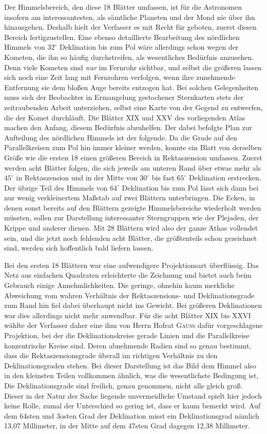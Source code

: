 Der Himmelsbereich, den diese 18 Blätter umfassen, ist für die Astronomen insofern am interessantesten, als sämtliche Planeten und der Mond nie über ihn hinausgehen. Deshalb hielt der Verfasser es mit Recht für geboten, zuerst diesen Bereich fertigzustellen. Eine ebenso detaillierte Bearbeitung des nördlichen Himmels von $32^\circ$ Deklination bis zum Pol wäre allerdings schon wegen der Kometen, die ihn so häufig durchstreifen, als wesentliches Bedürfnis anzusehen. Denn viele Kometen sind \emph{nur} im Fernrohr sichtbar, und selbst die größeren lassen sich noch eine Zeit lang mit Fernrohren verfolgen, wenn ihre zunehmende Entfernung sie dem bloßen Auge bereits entzogen hat. Bei solchen Gelegenheiten muss sich der Beobachter in Ermangelung gestochener Sternkarten stets der zeitraubenden Arbeit unterziehen, selbst eine Karte von der Gegend zu entwerfen, die der Komet durchläuft. Die Blätter XIX und XXV des vorliegenden Atlas machen den Anfang, diesem Bedürfnis abzuhelfen. Der dabei befolgte Plan zur Aufteilung des nördlichen Himmels ist der folgende. Da die Grade auf den Parallelkreisen zum Pol hin immer kleiner werden, konnte ein Blatt von derselben Größe wie die ersten 18 einen größeren Bereich in Rektaszension umfassen. Zuerst werden acht Blätter folgen, die sich jeweils am unteren Rand über etwas mehr als $45^\circ$ in Rektaszension und in der Mitte von $30^\circ$ bis fast $65^\circ$ Deklination erstrecken. Der übrige Teil des Himmels von $64^\circ$ Deklination bis zum Pol lässt sich dann bei nur wenig verkleinertem Maßstab auf zwei Blättern unterbringen. Die Ecken, in denen sonst bereits auf den Blättern gezeigte Himmelsbereiche wiederholt werden müssten, sollen zur Darstellung interessanter Sterngruppen wie der Plejaden, der Krippe und anderer dienen. Mit 28 Blättern wird also der ganze Athas vollendet sein, und die jetzt noch fehlenden acht Blätter, die größtenteils schon gezeichnet sind, werden sich hoffentlich bald liefern lassen.

Bei den ersten 18 Blättern war eine aufwendigere Projektionsart überflüssig. Das Netz aus einfachen Quadraten erleichterte die Zeichnung und bietet auch beim Gebrauch einige Annehmlichkeiten. Die geringe, ohnehin kaum merkliche Abweichung vom wahren Verhältnis der Rektaszensions- und Deklinationsgrade zum Rand hin fiel dabei überhaupt nicht ins Gewicht. Bei größeren Deklinationen war dies allerdings nicht mehr anwendbar. Für die acht Blätter XIX bis XXVI wählte der Verfasser daher eine ihm von Herrn Hofrat \textsc{Gauß} dafür vorgeschlagene Projektion, bei der die Deklinationskreise gerade Linien und die Parallelkreise konzentrische Kreise sind. Deren abnehmende Radien sind so genau bestimmt, dass die Rektaszensionsgrade überall im richtigen Verhältnis zu den Deklinationsgraden stehen. Bei dieser Darstellung ist das Bild dem Himmel also in den kleinsten Teilen vollkommen ähnlich, was die wesentlichste Bedingung ist, Die Deklinationsgrade sind freilich, genau genommen, nicht alle gleich groß. Dieser in der Natur der Sache liegende unvermeidliche Umstand spielt hier jedoch keine Rolle, zumal der Unterschied so gering ist, dass er kaum bemerkt wird. Auf dem 64sten und 3osten Grad der Deklination misst ein Deklinationsgrad nämlich 13,07 Millimeter, in der Mitte auf dem 47sten Grad dagegen 12,38 Millimeter.

